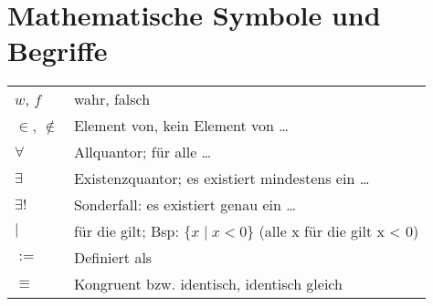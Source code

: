 \section{Mathematische Symbole und Begriffe}
\settowidth{\MyLenA}{Primzahl~~}
\begin{tabular}{@{}p{\the\MyLenA}%
				@{}p{\linewidth-\the\MyLenA}}
	$w$, $f$ & wahr, falsch \\
	$\in$, $\notin$  & Element von, kein Element von \dots\\
	$\forall$ & Allquantor; für alle \dots\\
	$\exists$ & Existenzquantor; es existiert mindestens ein \dots \\
	$\exists !$ & Sonderfall: es existiert genau ein \dots \\
	$\mid$ & für die gilt; Bsp: $\{x\mid x < 0\}$ (alle x für die gilt x < 0)\\
	$:=$ & Definiert als\\
	$\equiv$ & Kongruent bzw. identisch, identisch gleich\\
\end{tabular}
